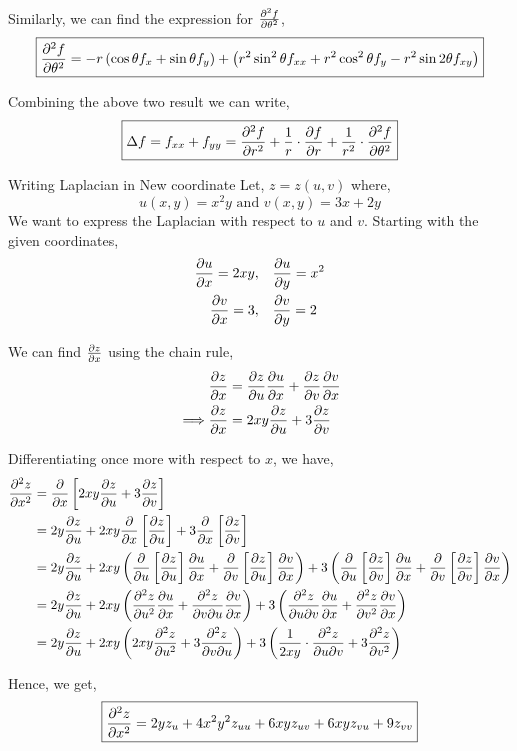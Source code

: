 \documentclass[../Analysis-3.tex]{subfiles}
\begin{document}
Similarly, we can find the expression for $\pdv[2]{f}{\theta}$,
\[
  \boxed{\pdv[2]{f}{\theta} = -r \left( \cos{\theta} f_x + \sin{\theta} f_y \right) + \left( r^2\sin^2 \theta f_{xx} + r^2\cos^2 \theta f_{y} - r^2\sin 2 \theta f_{xy} \right)}
\]

Combining the above two result we can write,
\[
  \boxed{\Delta f = f_{xx} + f_{yy} = \pdv[2]{f}{r} + \frac{1}{r}\cdot\pdv{f}{r} + \frac{1}{r^2}\cdot\pdv[2]{f}{\theta}}
\]

\begin{Eg}{Writing Laplacian in New coordinate}{}
  Let, $z = z(u,v)$ where, \[ u(x,y) = x^2y \text{ and } v(x,y) = 3x + 2y \]
  We want to express the Laplacian with respect to $u$ and $v$. Starting with the given coordinates, \begin{align*}
    \pdv{u}{x} = 2xy, \quad & \pdv{u}{y} = x^2 \\
    \pdv{v}{x} = 3, \quad   & \pdv{v}{y} = 2
  \end{align*}

  We can find $\pdv{z}{x}$ using the chain rule,
  \begin{align*}
             & \pdv{z}{x} = \pdv{z}{u} \pdv{u}{x} + \pdv{z}{v} \pdv{v}{x} \\
    \implies & \pdv{z}{x} = 2xy \pdv{z}{u} + 3 \pdv{z}{v}                 \\
  \end{align*}

  Differentiating once more with respect to $x$, we have,
  \begin{align*}
    \pdv[2]{z}{x}
     & = \pdv{}{x} \left[ 2xy \pdv{z}{u} + 3 \pdv{z}{v} \right]                                                                                                                                                                                      \\
     & = 2y \pdv{z}{u} + 2xy \pdv{}{x} \left[\pdv{z}{u}\right]  + 3\pdv{}{x} \left[\pdv{z}{v}\right]                                                                                                                                                 \\
     & = 2y \pdv{z}{u} + 2xy \left(\pdv{}{u} \left[\pdv{z}{u}\right] \pdv{u}{x} + \pdv{}{v} \left[\pdv{z}{u}\right] \pdv{v}{x}\right)  + 3\left( \pdv{}{u} \left[\pdv{z}{v}\right] \pdv{u}{x} + \pdv{}{v} \left[\pdv{z}{v}\right] \pdv{v}{x} \right) \\
     & = 2y \pdv{z}{u} + 2xy \left(\pdv[2]{z}{u} \pdv{u}{x} + \pdv{z}{v}{u} \pdv{v}{x}\right)  + 3\left( \pdv{z}{u}{v} \pdv{u}{x} + \pdv[2]{z}{v} \pdv{v}{x}\right)                                                                                  \\
     & = 2y \pdv{z}{u} + 2xy \left(2xy \pdv[2]{z}{u}  + 3 \pdv{z}{v}{u}\right)  + 3\left( \frac{1}{2xy}\cdot\pdv{z}{u}{v}  + 3\pdv[2]{z}{v}\right)
  \end{align*}

  Hence, we get,
  \[
    \boxed{\pdv[2]{z}{x} = 2y z_u + 4x^2y^2z_{uu}+ 6xy z_{uv} + 6xy z_{vu} + 9z_{vv}}
  \]
\end{Eg}
\end{document}
